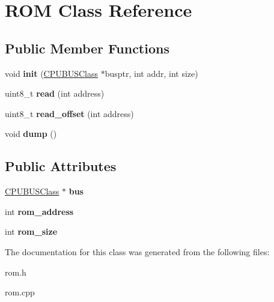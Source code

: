 \hypertarget{classROM}{\section{R\-O\-M Class Reference}
\label{classROM}
}
\subsection*{Public Member Functions}
\begin{DoxyCompactItemize}
\item 
\hypertarget{classROM_aea2555cada1d077a6dfaf96380fc1fc0}{void {\bfseries init} (\hyperlink{classCPUBUSClass}{C\-P\-U\-B\-U\-S\-Class} $\ast$busptr, int addr, int size)}\label{classROM_aea2555cada1d077a6dfaf96380fc1fc0}

\item 
\hypertarget{classROM_ac3bb73826a151ceda7c80fe1e4f45331}{uint8\-\_\-t {\bfseries read} (int address)}\label{classROM_ac3bb73826a151ceda7c80fe1e4f45331}

\item 
\hypertarget{classROM_a6b9d004b23b2ba9d65eb9de41b75d250}{uint8\-\_\-t {\bfseries read\-\_\-offset} (int address)}\label{classROM_a6b9d004b23b2ba9d65eb9de41b75d250}

\item 
\hypertarget{classROM_afccfd3650bbd6ed1637f5ead844e86a1}{void {\bfseries dump} ()}\label{classROM_afccfd3650bbd6ed1637f5ead844e86a1}

\end{DoxyCompactItemize}
\subsection*{Public Attributes}
\begin{DoxyCompactItemize}
\item 
\hypertarget{classROM_aa0e8713b59fee793cd51f8657342242b}{\hyperlink{classCPUBUSClass}{C\-P\-U\-B\-U\-S\-Class} $\ast$ {\bfseries bus}}\label{classROM_aa0e8713b59fee793cd51f8657342242b}

\item 
\hypertarget{classROM_a88a16bc3dcf8e2c2b9e056eca070994e}{int {\bfseries rom\-\_\-address}}\label{classROM_a88a16bc3dcf8e2c2b9e056eca070994e}

\item 
\hypertarget{classROM_ab088631203d67cb90eb7711b64c2ac32}{int {\bfseries rom\-\_\-size}}\label{classROM_ab088631203d67cb90eb7711b64c2ac32}

\end{DoxyCompactItemize}


The documentation for this class was generated from the following files\-:\begin{DoxyCompactItemize}
\item 
rom.\-h\item 
rom.\-cpp\end{DoxyCompactItemize}
